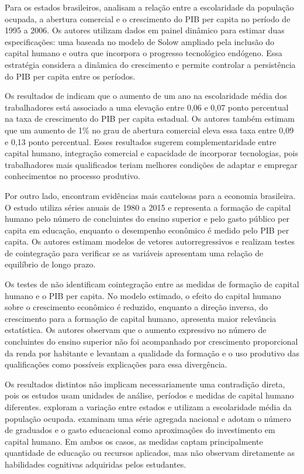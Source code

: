 \documentclass[
	12pt,				%
	openright,			%
	oneside,			%
	a4paper,			%
	brazil,				%
	]{article}
\begin{document}
Para os estados brasileiros, \textcite{FragaBacha2013_AberturaCapitalHumanoCrescimento}
analisam a relação entre a escolaridade da população ocupada, a abertura
comercial e o crescimento do PIB per capita no período de 1995 a 2006. Os autores
utilizam dados em painel dinâmico para estimar duas especificações: uma baseada
no modelo de Solow ampliado pela inclusão do capital humano e outra que incorpora
o progresso tecnológico endógeno. Essa estratégia considera a dinâmica do
crescimento e permite controlar a persistência do PIB per capita entre os
períodos.

Os resultados de \textcite{FragaBacha2013_AberturaCapitalHumanoCrescimento}
indicam que o aumento de um ano na escolaridade média dos trabalhadores está
associado a uma elevação entre 0,06 e 0,07 ponto percentual na taxa de crescimento
do PIB per capita estadual. Os autores também estimam que um aumento de 1\% no
grau de abertura comercial eleva essa taxa entre 0,09 e 0,13 ponto percentual.
Esses resultados sugerem complementaridade entre capital humano, integração
comercial e capacidade de incorporar tecnologias, pois trabalhadores mais
qualificados teriam melhores condições de adaptar e empregar conhecimentos no
processo produtivo.

Por outro lado, \textcite{ChavesEtAl2019} encontram evidências mais cautelosas
para a economia brasileira. O estudo utiliza séries anuais de 1980 a 2015 e
representa a formação de capital humano pelo número de concluintes do ensino
superior e pelo gasto público per capita em educação, enquanto o desempenho
econômico é medido pelo PIB per capita. Os autores estimam modelos de vetores
autorregressivos e realizam testes de cointegração para verificar se as variáveis
apresentam uma relação de equilíbrio de longo prazo.

Os testes de \textcite{ChavesEtAl2019} não identificam cointegração entre as
medidas de formação de capital humano e o PIB per capita. No modelo estimado, o
efeito do capital humano sobre o crescimento econômico é reduzido, enquanto a
direção inversa, do crescimento para a formação de capital humano, apresenta
maior relevância estatística. Os autores observam que o aumento expressivo no
número de concluintes do ensino superior não foi acompanhado por crescimento
proporcional da renda por habitante e levantam a qualidade da formação e o uso
produtivo das qualificações como possíveis explicações para essa divergência.

Os resultados distintos não implicam necessariamente uma contradição direta,
pois os estudos usam unidades de análise, períodos e medidas de capital humano
diferentes. \textcite{FragaBacha2013_AberturaCapitalHumanoCrescimento} exploram
a variação entre estados e utilizam a escolaridade média da população ocupada.
\textcite{ChavesEtAl2019} examinam uma série agregada nacional e adotam o número
de graduados e o gasto educacional como aproximações do investimento em capital
humano. Em ambos os casos, as medidas captam principalmente quantidade de
educação ou recursos aplicados, mas não observam diretamente as habilidades
cognitivas adquiridas pelos estudantes.
\end{document}
